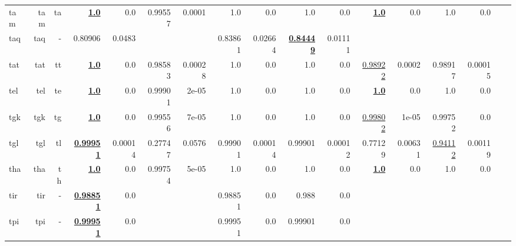 \documentclass[11pt]{article}
\begin{document}
\begin{table*}[h]
{\begin{tabular}{lrrrrrrrrrrrrrrrr}
tam         & tam         & ta         & \textbf{\underline{1.0}}         & 0.0         & 0.99557         & 0.0001         & 1.0         & 0.0         & 1.0         & 0.0         & \textbf{\underline{1.0}}         & 0.0         & 1.0         & 0.0         \\
taq         & taq         & -         & 0.80906         & 0.0483         &          &          & 0.83861         & 0.02664         & \textbf{\underline{0.84449}}         & 0.01111         &          &          &          &          \\
tat         & tat         & tt         & \textbf{\underline{1.0}}         & 0.0         & 0.98583         & 0.00028         & 1.0         & 0.0         & 1.0         & 0.0         & \underline{0.98922}         & 0.0002         & 0.98917         & 0.00015         \\
tel         & tel         & te         & \textbf{\underline{1.0}}         & 0.0         & 0.99901         & 2e-05         & 1.0         & 0.0         & 1.0         & 0.0         & \textbf{\underline{1.0}}         & 0.0         & 1.0         & 0.0         \\
tgk         & tgk         & tg         & \textbf{\underline{1.0}}         & 0.0         & 0.99556         & 7e-05         & 1.0         & 0.0         & 1.0         & 0.0         & \underline{0.99802}         & 1e-05         & 0.99752         & 0.0         \\
tgl         & tgl         & tl         & \textbf{\underline{0.99951}}         & 0.00014         & 0.27747         & 0.0576         & 0.99901         & 0.00014         & 0.99901         & 0.00012         & 0.77129         & 0.00631         & \underline{0.94112}         & 0.00119         \\
tha         & tha         & th         & \textbf{\underline{1.0}}         & 0.0         & 0.99754         & 5e-05         & 1.0         & 0.0         & 1.0         & 0.0         & \textbf{\underline{1.0}}         & 0.0         & 1.0         & 0.0         \\
tir         & tir         & -         & \textbf{\underline{0.98851}}         & 0.0         &          &          & 0.98851         & 0.0         & 0.988         & 0.0         &          &          &          &          \\
tpi         & tpi         & -         & \textbf{\underline{0.99951}}         & 0.0         &          &          & 0.99951         & 0.0         & 0.99901         & 0.0         &          &          &          &          \\

\end{tabular}}
\end{table*}
\end{document}

